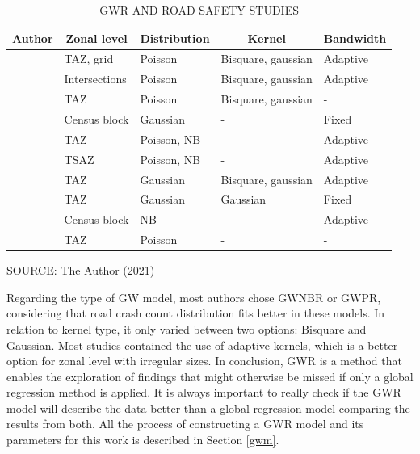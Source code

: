 \begin{table}[!htbp]
    \footnotesize
    \captionsetup{justification=raggedright,
        singlelinecheck=false,
        font=footnotesize}
    \caption{GWR AND ROAD SAFETY STUDIES}
    \centering
    \begin{tabular}{lllp{1.6cm}l}
        \hline
        \multicolumn{1}{c}{\textbf{Author}} & \multicolumn{1}{c}{\textbf{Zonal level}} & \multicolumn{1}{c}{\textbf{Distribution}} & \multicolumn{1}{c}{\textbf{Kernel}} & \multicolumn{1}{c}{\textbf{Bandwidth}} \\
        \hline 
        \textcite{Amoh-Gyimah2017} & TAZ, grid & Poisson & Bisquare, gaussian & Adaptive \\
        \textcite{Arvin2019} & Intersections & Poisson & Bisquare, gaussian & Adaptive \\
        \textcite{Hadayeghi2010} & TAZ & Poisson & Bisquare, gaussian & - \\
        \textcite{Huang2018} & Census block & Gaussian & - & Fixed \\
        \textcite{Obelheiro2019} & TAZ & Poisson, NB & - & Adaptive \\
        \textcite{Obelheiro2020} & TSAZ & Poisson, NB & - & Adaptive \\
        \textcite{Pirdavani2014} & TAZ & Gaussian & Bisquare, gaussian & Adaptive \\
        \textcite{Rhee2016} & TAZ & Gaussian & Gaussian & Fixed \\
        \textcite{Yu2017} & Census block & NB & - & Adaptive \\
        \textcite{Zhang2015} & TAZ & Poisson & - & - \\
        \hline
    \end{tabular}
    \label{tab:gwrworks}
    \par \vspace{2mm} \footnotesize \raggedright
    SOURCE: The Author (2021)
\end{table}

Regarding the type of GW model, most authors chose GWNBR or GWPR, considering that road crash count distribution fits better in these models. In relation to kernel type, it only varied between two options: Bisquare and Gaussian. Most studies contained the use of adaptive kernels, which is a better option for zonal level with irregular sizes. In conclusion, GWR is a method that enables the exploration of findings that might otherwise be missed if only a global regression method is applied. It is always important to really check if the GWR model will describe the data better than a global regression model comparing the results from both. All the process of constructing a GWR model and its parameters for this work is described in Section \ref{gwm}.

